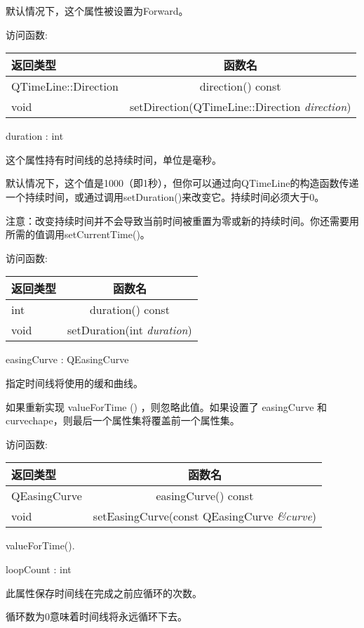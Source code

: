 默认情况下，这个属性被设置为Forward。

访问函数:


\begin{tabular}{|l|c|}
\hline
返回类型	& 函数名 \\ 
\hline
QTimeLine::Direction	 & direction() const \\ 
\hline
void	& setDirection(QTimeLine::Direction \emph{direction})  \\ 
\hline
\end{tabular}

duration : int

这个属性持有时间线的总持续时间，单位是毫秒。

默认情况下，这个值是1000（即1秒），但你可以通过向QTimeLine的构造函数传递一个持续时间，或通过调用setDuration()来改变它。持续时间必须大于0。

注意：改变持续时间并不会导致当前时间被重置为零或新的持续时间。你还需要用所需的值调用setCurrentTime()。

访问函数:

\begin{tabular}{|l|c|}
\hline
返回类型	& 函数名 \\ 
\hline
int	& duration() const \\ 
\hline
void	& setDuration(int \emph{duration}) \\
\hline
\end{tabular}

easingCurve : QEasingCurve

指定时间线将使用的缓和曲线。

如果重新实现 valueForTime () ，则忽略此值。如果设置了 easingCurve 和 curvechape，则最后一个属性集将覆盖前一个属性集。

访问函数:

\begin{tabular}{|l|c|}
\hline
返回类型	& 函数名 \\ 
\hline
QEasingCurve &	easingCurve() const \\ 
\hline
void &	setEasingCurve(const QEasingCurve \emph{\&curve}) \\
\hline
\end{tabular}

\begin{seeAlso}
valueForTime().
\end{seeAlso}

loopCount : int

此属性保存时间线在完成之前应循环的次数。

循环数为0意味着时间线将永远循环下去。

